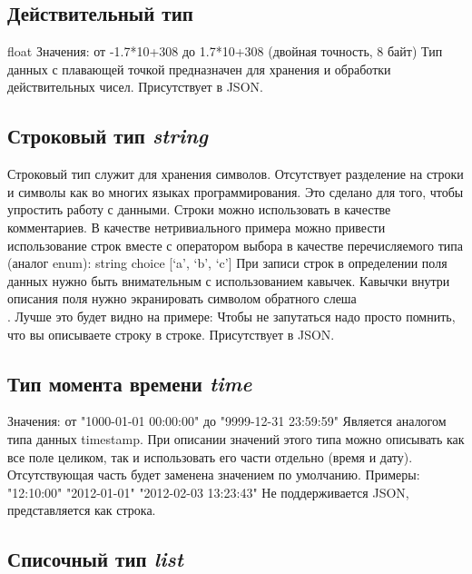 \subsection{Действительный тип}
float
Значения: от -1.7*10+308 до 1.7*10+308 (двойная точность, 8 байт)
Тип данных с плавающей точкой предназначен для хранения и обработки действительных чисел.
Присутствует в JSON.

\subsection{Строковый тип \emph{string}}
Строковый тип служит для хранения символов. Отсутствует разделение на строки и символы как во многих языках программирования. Это сделано для того, чтобы упростить работу с данными. Строки можно использовать в качестве комментариев. В качестве нетривиального примера можно привести использование строк вместе с оператором выбора в качестве перечисляемого типа (аналог enum):
        string choice [‘a’, ‘b’, ‘c’]
При записи строк в определении поля данных нужно быть внимательным с использованием кавычек. Кавычки внутри описания поля нужно экранировать символом обратного слеша \\. Лучше это будет видно на примере:
Чтобы не запутаться надо просто помнить, что вы описываете строку в строке.
Присутствует в JSON.

\subsection{Тип момента времени \emph{time}}

Значения: от "1000-01-01 00:00:00" до "9999-12-31 23:59:59"
Является аналогом типа данных timestamp. При описании значений этого типа можно описывать как все поле целиком, так и использовать его части отдельно (время и дату). Отсутствующая часть будет заменена значением по умолчанию. Примеры:
        "12:10:00"
        "2012-01-01"
        "2012-02-03 13:23:43"
Не поддерживается JSON, представляется как строка.

\subsection{Списочный тип \emph{list}}

